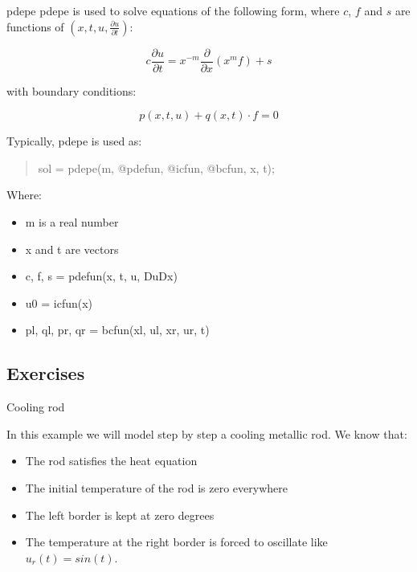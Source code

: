 \documentclass{beamer}
\begin{document}
  \begin{frame}{pdepe}
  	pdepe is used to solve equations of the following form, where $c$, $f$ and $s$ are functions of $(x,t,u, \frac{\partial u}{\partial t})$:
    
    \begin{displaymath} 
    c \frac{\partial u}{\partial t} = x^{-m} \frac{\partial}{\partial x}(x^m f) + s
    \end{displaymath}
    
    with boundary conditions:
    
    \begin{displaymath} 
    	p(x,t,u) + q(x,t) \cdot f = 0    
    \end{displaymath}
    
  	Typically, pdepe is used as:
    
    \begin{quotation}
		sol = pdepe(m, @pdefun, @icfun, @bcfun, x, t);
    \end{quotation}
    
    Where:
    
    \begin{itemize}
    
    	\item m is a real number
    	\item x and t are vectors
    	\item c, f, s = pdefun(x, t, u, DuDx)
    	\item u0 = icfun(x)
    	\item pl, ql, pr, qr = bcfun(xl, ul, xr, ur, t)
    
    \end{itemize}

    
  \end{frame}
  
  \subsection{Exercises}
  
  \begin{frame}{Cooling rod}
  
  In this example we will model step by step a cooling metallic rod. We know that:
  
  	\begin{itemize}
    \item The rod satisfies the heat equation
  	\item The initial temperature of the rod is zero everywhere
    \item The left border is kept at zero degrees
    \item The temperature at the right border is forced to oscillate like $u_r(t) = sin(t)$.
  	\end{itemize}
    
  \end{frame}
  
\end{document}
